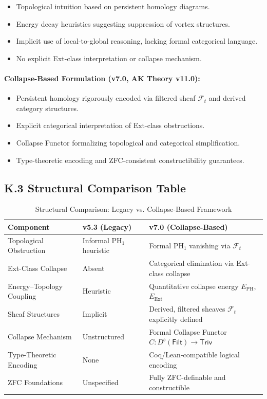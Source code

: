 \documentclass[11pt]{article}
\begin{document}
\begin{itemize}
  \item Topological intuition based on persistent homology diagrams.
  \item Energy decay heuristics suggesting suppression of vortex structures.
  \item Implicit use of local-to-global reasoning, lacking formal categorical language.
  \item No explicit Ext-class interpretation or collapse mechanism.
\end{itemize}

\paragraph{Collapse-Based Formulation (v7.0, AK Theory v11.0):}

\begin{itemize}
  \item Persistent homology rigorously encoded via filtered sheaf \( \mathcal{F}_t \) and derived category structures.
  \item Explicit categorical interpretation of Ext-class obstructions.
  \item Collapse Functor formalizing topological and categorical simplification.
  \item Type-theoretic encoding and ZFC-consistent constructibility guarantees.
\end{itemize}

\subsection*{K.3 Structural Comparison Table}


\begin{table}[H]
\centering
\begin{tabularx}{\textwidth}{|l|X|X|}
\hline
\textbf{Component} & \textbf{v5.3 (Legacy)} & \textbf{v7.0 (Collapse-Based)} \\
\hline
Topological Obstruction & Informal PH\(_1\) heuristic & Formal PH\(_1\) vanishing via \(\mathcal{F}_t\) \\
Ext-Class Collapse & Absent & Categorical elimination via Ext-class collapse \\
Energy–Topology Coupling & Heuristic & Quantitative collapse energy \( E_{\mathrm{PH}} \), \( E_{\mathrm{Ext}} \) \\
Sheaf Structures & Implicit & Derived, filtered sheaves \(\mathcal{F}_t\) explicitly defined \\
Collapse Mechanism & Unstructured & Formal Collapse Functor \( C : D^b(\mathsf{Filt}) \to \mathsf{Triv} \) \\
Type-Theoretic Encoding & None & Coq/Lean-compatible logical encoding \\
ZFC Foundations & Unspecified & Fully ZFC-definable and constructible \\
\hline
\end{tabularx}
\caption{Structural Comparison: Legacy vs. Collapse-Based Framework}
\end{table}
\end{document}
